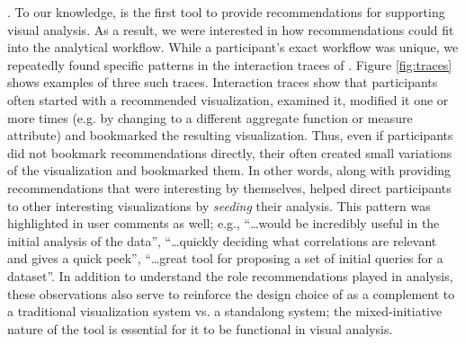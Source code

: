 {. 
To our knowledge, \SeeDB is the first tool to provide recommendations for supporting visual
analysis.
As a result, we were interested in how recommendations could fit into the analytical workflow.
While a participant's exact workflow was unique, we repeatedly found specific patterns in the
interaction traces of \SeeDB.
Figure \ref{fig:traces} shows examples of three such traces.
Interaction traces show that participants often started with a recommended visualization, 
examined it, modified it one or more times (e.g. by changing to a different aggregate function 
or measure attribute) and bookmarked the resulting visualization.
Thus, even if participants did not bookmark recommendations directly, their often created
small variations of the visualization and bookmarked them.
In other words, along with providing recommendations that were interesting by themselves, \SeeDB
helped direct participants to other interesting visualizations by {\em seeding} their analysis.
This pattern was highlighted in user comments as well; e.g.,
``\ldots would be incredibly useful in the initial analysis of the data'', 
``\ldots quickly deciding what correlations are relevant and gives a quick peek'',
``\ldots great tool for proposing a set of initial queries for a dataset''.
In addition to understand the role recommendations played in analysis, these observations 
also serve to reinforce the design choice of \SeeDB as a complement to a traditional
visualization system vs. a standalong system; the mixed-initiative nature of the tool 
is essential for it to be functional in visual analysis.
}


